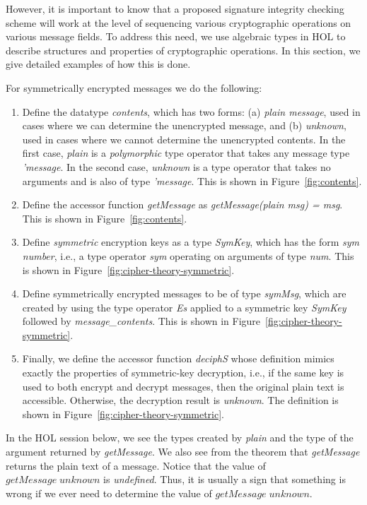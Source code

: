 However, it is important to know that a proposed signature integrity
checking scheme will work at the level of sequencing various
cryptographic operations on various message fields. To address this
need, we use algebraic types in HOL to describe structures and
properties of cryptographic operations. In this section, we give
detailed examples of how this is done.

For symmetrically encrypted messages we do the following:
\begin{enumerate}
\item Define the datatype \emph{contents}, which has two forms: (a)
  \emph{plain message}, used in cases where we can determine the
  unencrypted message, and (b) \emph{unknown}, used in cases where we
  cannot determine the unencrypted contents. In the first case,
  \emph{plain} is a \emph{polymorphic} type operator that takes any
  message type \emph{'message}. In the second case, \emph{unknown} is
  a type operator that takes no arguments and is also of type
  \emph{'message}. This is shown in Figure~\ref{fig:contents}.
\item Define the accessor function \emph{getMessage} as
  \emph{getMessage(plain msg) = msg}. This is shown in
  Figure~\ref{fig:contents}.
\item Define \emph{symmetric} encryption keys as a type \emph{SymKey},
  which has the form \emph{sym number}, i.e., a type operator
  \emph{sym} operating on arguments of type \emph{num}. This is shown
  in Figure~\ref{fig:cipher-theory-symmetric}.
\item Define symmetrically encrypted messages to be of type
  \emph{symMsg}, which are created by using the type operator
  \emph{Es} applied to a symmetric key \emph{SymKey} followed by
  \emph{message\_contents}.  This is shown in
  Figure~\ref{fig:cipher-theory-symmetric}.
\item Finally, we define the accessor function \emph{deciphS} whose
  definition mimics exactly the properties of symmetric-key
  decryption, i.e., if the same key is used to both encrypt and
  decrypt messages, then the original plain text is
  accessible. Otherwise, the decryption result is \emph{unknown}. The
  definition is shown in Figure~\ref{fig:cipher-theory-symmetric}.
\end{enumerate}



In the HOL session below, we see the types created by \emph{plain} and
the type of the argument returned by \emph{getMessage}.  We also see
from the theorem that \emph{getMessage} returns the plain text of a
message. Notice that the value of $getMessage \;unknown$ is
\emph{undefined}. Thus, it is usually a sign that something is wrong
if we ever need to determine the value of $getMessage \;unknown$.

